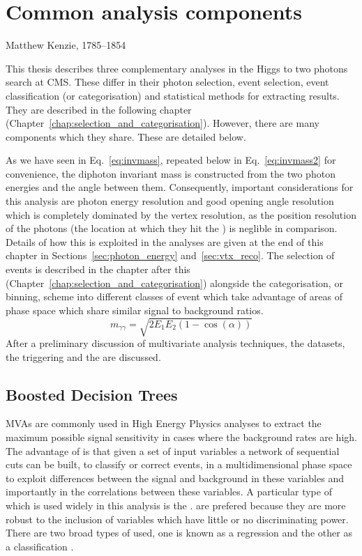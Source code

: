 \chapter{Common analysis components}
\label{chap:common_analysis_components}
{Matthew Kenzie, 1785--1854}

This thesis describes three complementary analyses in the Higgs to two photons search at CMS. These differ in their photon selection, event selection, event classification (or categorisation) and statistical methods for extracting results. They are described in the following chapter (Chapter~\ref{chap:selection_and_categorisation}). However, there are many components which they share. These are detailed below.

As we have seen in Eq.~\ref{eq:invmass}, repeated below in Eq.~\ref{eq:invmass2} for convenience, the diphoton invariant mass is constructed from the two photon energies and the angle between them. Consequently, important considerations for this analysis are photon energy resolution and good opening angle resolution which is completely dominated by the vertex resolution, as the position resolution of the photons (the location at which they hit the \ECAL) is neglible in comparison. Details of how this is exploited in the analyses are given at the end of this chapter in Sections~\ref{sec:photon_energy} and~\ref{sec:vtx_reco}. The selection of events is described in the chapter after this (Chapter~\ref{chap:selection_and_categorisation}) alongside the categorisation, or binning, scheme into different classes of event which take advantage of areas of phase space which share similar signal to background ratios.
\begin{equation}
  m_{\gamma\gamma} = \sqrt{2E_{1}E_{2}(1-\cos(\alpha))}
  \label{eq:invmass2}
\end{equation}
After a preliminary discussion of multivariate analysis techniques, the datasets, the triggering and the \MC are discussed.

\section{Boosted Decision Trees}
\label{sec:bdts}
\acf{MVAs} are commonly used in High Energy Physics analyses to extract the maximum possible signal sensitivity in cases where the background rates are high. The advantage of \MVAs is that given a set of input variables a network of sequential cuts can be built, to classify or correct events, in a multidimensional phase space to exploit differences between the signal and background in these variables and importantly in the correlations between these variables. A particular type of \MVA which is used widely in this analysis is the \BDT. \BDTs are prefered because they are more robust to the inclusion of variables which have little or no discriminating power. There are two broad types of \BDT used, one is known as a regression \BDT and the other as a classification \BDT. 

